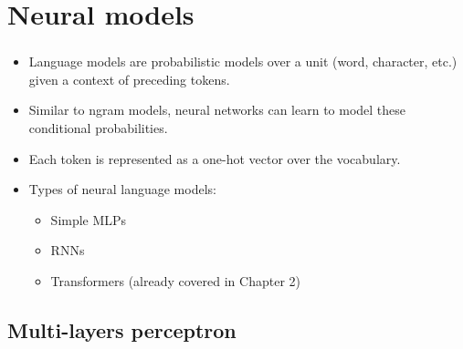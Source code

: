 \documentclass[xcolor=table]{beamer}
\begin{document}
\section{Neural models}

\begin{frame}
	\frametitle{\insertshortsubtitle}
	\framesubtitle{\insertsection}
	
	\begin{itemize}
		\item Language models are probabilistic models over a unit (word, character, etc.) given a context of preceding tokens.
		\item Similar to ngram models, neural networks can learn to model these conditional probabilities.
		\item Each token is represented as a one-hot vector over the vocabulary.
		\item Types of neural language models:
		\begin{itemize}
			\item Simple MLPs
			\item RNNs
			\item Transformers (already covered in Chapter 2)
		\end{itemize}
	\end{itemize}
	
\end{frame}

\subsection{Multi-layers perceptron}
\end{document}
